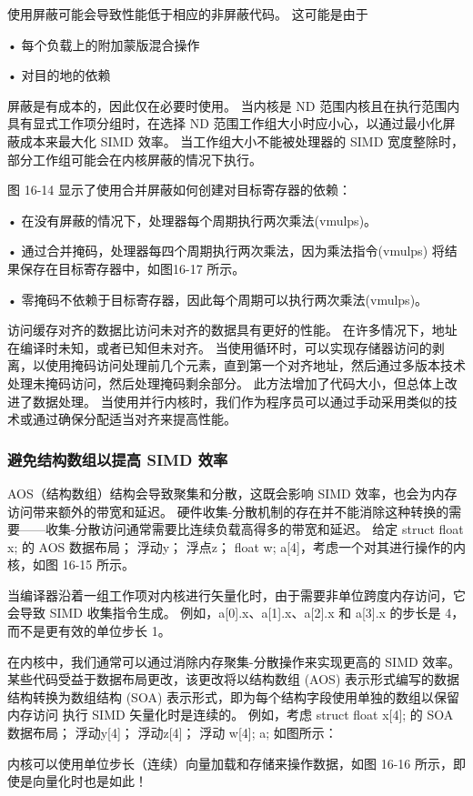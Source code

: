 使用屏蔽可能会导致性能低于相应的非屏蔽代码。 这可能是由于

• 每个负载上的附加蒙版混合操作

• 对目的地的依赖

屏蔽是有成本的，因此仅在必要时使用。 当内核是 ND 范围内核且在执行范围内具有显式工作项分组时，在选择 ND 范围工作组大小时应小心，以通过最小化屏蔽成本来最大化 SIMD 效率。 当工作组大小不能被处理器的 SIMD 宽度整除时，部分工作组可能会在内核屏蔽的情况下执行。

图 16-14 显示了使用合并屏蔽如何创建对目标寄存器的依赖：

• 在没有屏蔽的情况下，处理器每个周期执行两次乘法(vmulps)。

• 通过合并掩码，处理器每四个周期执行两次乘法，因为乘法指令(vmulps) 将结果保存在目标寄存器中，如图16-17 所示。

• 零掩码不依赖于目标寄存器，因此每个周期可以执行两次乘法(vmulps)。

访问缓存对齐的数据比访问未对齐的数据具有更好的性能。 在许多情况下，地址在编译时未知，或者已知但未对齐。 当使用循环时，可以实现存储器访问的剥离，以使用掩码访问处理前几个元素，直到第一个对齐地址，然后通过多版本技术处理未掩码访问，然后处理掩码剩余部分。 此方法增加了代码大小，但总体上改进了数据处理。 当使用并行内核时，我们作为程序员可以通过手动采用类似的技术或通过确保分配适当对齐来提高性能。

\subsubsection{避免结构数组以提高 SIMD 效率}
AOS（结构数组）结构会导致聚集和分散，这既会影响 SIMD 效率，也会为内存访问带来额外的带宽和延迟。 硬件收集-分散机制的存在并不能消除这种转换的需要——收集-分散访问通常需要比连续负载高得多的带宽和延迟。 给定 struct {float x; 的 AOS 数据布局； 浮动y； 浮点z； float w;} a[4]，考虑一个对其进行操作的内核，如图 16-15 所示。

当编译器沿着一组工作项对内核进行矢量化时，由于需要非单位跨度内存访问，它会导致 SIMD 收集指令生成。 例如，a[0].x、a[1].x、a[2].x 和 a[3].x 的步长是 4，而不是更有效的单位步长 1。

在内核中，我们通常可以通过消除内存聚集-分散操作来实现更高的 SIMD 效率。 某些代码受益于数据布局更改，该更改将以结构数组 (AOS) 表示形式编写的数据结构转换为数组结构 (SOA) 表示形式，即为每个结构字段使用单独的数组以保留内存访问 执行 SIMD 矢量化时是连续的。 例如，考虑 struct {float x[4]; 的 SOA 数据布局； 浮动y[4]； 浮动z[4]； 浮动 w[4];} a; 如图所示：

内核可以使用单位步长（连续）向量加载和存储来操作数据，如图 16-16 所示，即使是向量化时也是如此！

